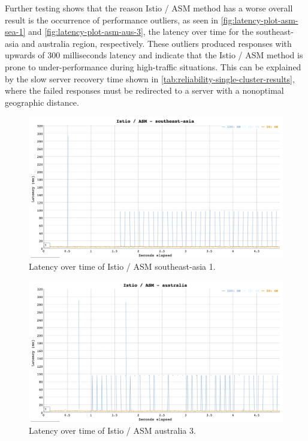 Further testing shows that the reason Istio / ASM method has a worse overall result is the occurrence of performance outliers, as seen in \autoref{fig:latency-plot-asm-sea-1} and  \autoref{fig:latency-plot-asm-aus-3}, the latency over time for the southeast-asia and australia region, respectively. These outliers produced responses with upwards of 300 milliseconds latency and indicate that the Istio / ASM method is prone to under-performance during high-traffic situations. This can be explained by the slow server recovery time shown in \autoref{tab:reliability-single-cluster-results}, where the failed responses must be redirected to a server with a nonoptimal geographic distance.

\begin{figure}
	\centering
	\includegraphics[width=1\textwidth]{assets/plots/asm-sea-1.png}
    \caption{Latency over time of Istio / ASM southeast-asia 1.}
	\label{fig:latency-plot-asm-sea-1}
\end{figure}

\begin{figure}
	\centering
	\includegraphics[width=1\textwidth]{assets/plots/asm-aus-3.png}
	\caption{Latency over time of Istio / ASM australia 3.}
	\label{fig:latency-plot-asm-aus-3}
\end{figure}

